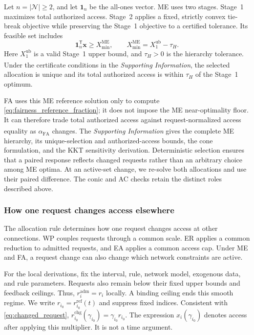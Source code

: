 \documentclass[twoside,twocolumn,9pt]{article}
\newcommand{\suppref}{\textit{Supporting Information}\textsuperscript{\dag}}
\begin{document}
{Let $n=|\mathcal N|\ge2$, and let $\mathbf 1_n$ be the all-ones vector. ME uses
two stages. Stage~1 maximizes total authorized access. Stage~2 applies a fixed,
strictly convex tie-break objective while preserving the Stage~1 objective to a
certified tolerance. Its feasible set includes
\begin{equation}
\mathbf 1_n^{\mathsf T}\mathbf x\ge X_{\min}^{\mathrm{ME}},
\qquad X_{\min}^{\mathrm{ME}}=X_1^{\mathrm{ub}}-\tau_H.
\label{eq:certified_near_optimal_set}
\end{equation}
Here $X_1^{\mathrm{ub}}$ is a valid Stage~1 upper bound, and $\tau_H>0$ is the
hierarchy tolerance. Under the certificate conditions in the \suppref{}, the
selected allocation is unique and its total authorized access is within
$\tau_H$ of the Stage~1 optimum.

FA uses this ME reference solution only to compute
\eqref{eq:fairness_reference_fraction}; it does not impose the ME near-optimality
floor. It can therefore trade total authorized access against request-normalized
access equality as $\alpha_{\mathrm{FA}}$ changes. The \suppref{} gives the
complete ME hierarchy, its unique-selection and authorized-access bounds, the
cone formulation, and the KKT sensitivity derivation. Deterministic selection
ensures that a paired response reflects changed requests rather than an
arbitrary choice among ME optima. At an active-set change, we re-solve both
allocations and use their paired difference. The conic and AC checks retain
the distinct roles described above.


\subsubsection{How one request changes access elsewhere}
\label{sec:rule_response}

The allocation rule determines how one request changes access at other
connections. WP couples requests through a common scale. ER applies a common
reduction to admitted requests, and EA applies a common access cap. Under ME
and FA, a request change can also change which network constraints are active.

For the local derivations, fix the interval, rule, network model, exogenous data,
and rule parameters. Requests also remain below their fixed upper bounds and feedback
ceilings. Thus, $r_i^{\mathrm{adm}}=r_i$ locally. A binding ceiling ends this
smooth regime. We write $r_{i_0}=r_{i_0}^{\mathrm{ref}}(t)$ and suppress fixed
indices. Consistent with \eqref{eq:changed_request},
$r_{i_0}^{\mathrm{chg}}(\gamma_{i_0})=\gamma_{i_0}r_{i_0}$. The expression
$x_i(\gamma_{i_0})$ denotes access after applying this multiplier. It is not a
time argument.

}
\end{document}
